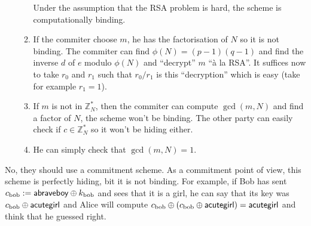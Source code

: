 \begin{solution}
\begin{enumerate}
\begin{enumerate}
          Under the assumption that the RSA problem is hard, the scheme is computationally binding.
        \item
          If the commiter choose $m$, he has the factorisation of $N$ so it is not binding.
          The commiter can find $\phi(N)=(p-1)(q-1)$ and find the inverse $d$ of $e$ modulo $\phi(N)$
          and ``decrypt'' $m$ ``à la RSA''.
          It suffices now to take $r_0$ and $r_1$ such that $r_{0}/r_{1}$ is this ``decryption'' which is easy (take for example $r_1 = 1$).
        \item
          If $m$ is not in $\mathbb{Z}_N^*$, then the commiter can compute $\gcd(m, N)$ and find a factor of $N$, the scheme won't be binding.
          The other party can easily check if $c \in \mathbb{Z}_N^*$ so it won't be hiding either.
        \item
          He can simply check that $\gcd(m, N) = 1$.
      \end{enumerate}
  \end{enumerate}
\end{solution}

\nosolution

\begin{solution}
  No, they should use a commitment scheme.
  As a commitment point of view, this scheme is perfectly hiding, bit it is not binding.
  For example, if Bob has sent $c_{\text{bob}} := \mathsf{abraveboy} \oplus k_{\text{bob}}$ and sees that it is a girl,
  he can say that its key was $c_{\text{bob}} \oplus \mathsf{acutegirl}$ and Alice will
  compute $c_{\text{bob}} \oplus (c_{\text{bob}} \oplus \mathsf{acutegirl}) = \mathsf{acutegirl}$ and think that he guessed right.
\end{solution}

